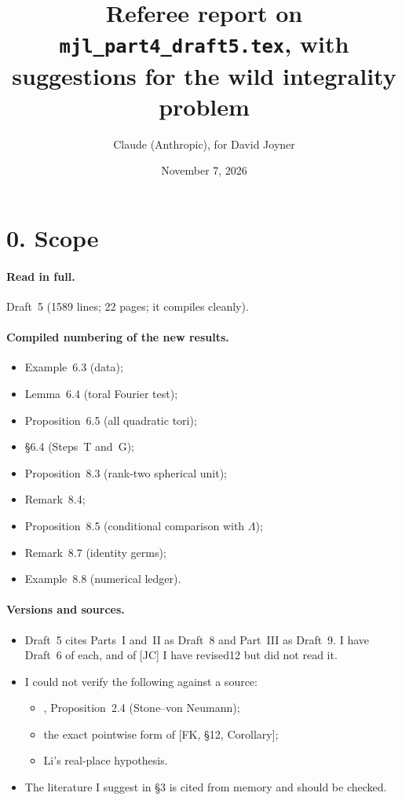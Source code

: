 \documentclass[11pt]{article}
\title{Referee report on \texttt{mjl\_part4\_draft5.tex}, with suggestions
for the wild integrality problem}
\author{Claude (Anthropic), for David Joyner}
\date{November 7, 2026}
\theoremstyle{plain}
\begin{document}
\maketitle

\section*{0. Scope}
\paragraph{Read in full.} Draft~5 (1589 lines; 22 pages; it compiles
cleanly).

\paragraph{Compiled numbering of the new results.}
\begin{itemize}
\item Example~6.3 (data);
\item Lemma~6.4 (toral Fourier test);
\item Proposition~6.5 (all quadratic tori);
\item \S6.4 (Steps~T and~G);
\item Proposition~8.3 (rank-two spherical unit);
\item Remark~8.4;
\item Proposition~8.5 (conditional comparison with $\Lambda$);
\item Remark~8.7 (identity germs);
\item Example~8.8 (numerical ledger).
\end{itemize}

\paragraph{Versions and sources.}
\begin{itemize}
\item Draft~5 cites Parts~I and~II as Draft~8 and Part~III as Draft~9. I
have Draft~6 of each, and of [JC] I have revised12 but did not read it.
\item I could not verify the following against a source:
\begin{itemize}
\item [JC], Proposition~2.4 (Stone--von Neumann);
\item the exact pointwise form of [FK, \S12, Corollary];
\item Li's real-place hypothesis.
\end{itemize}
\item The literature I suggest in \S3 is cited from memory and should be
checked.
\end{itemize}
\end{document}
